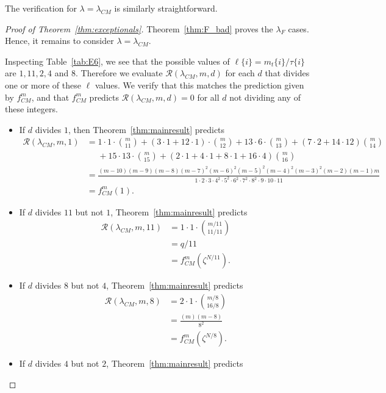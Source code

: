 \documentclass[12pt]{amsart}
\theoremstyle{definition}
\theoremstyle{remark}
\numberwithin{equation}{section}
\begin{document}
The verification for $\lambda = \lambda_{CM}$ is similarly straightforward. 

\begin{proof}[Proof of Theorem~\ref{thm:exceptionals}]
Theorem~\ref{thm:F_bad} proves the $\lambda_F$ cases. Hence, it remains to consider $\lambda = \lambda_{CM}$.

Inspecting Table~\ref{tab:E6}, we see that the possible values of $\ell\{i\} = m_t\{i\}/\tau\{i\}$ are $1,11,2,4$ and $8$. Therefore we evaluate $\mathcal{R}(\lambda_{CM},m,d)$ for each $d$ that divides one or more of these $\ell$ values. We verify that this matches the prediction given by $f^m_{CM}$, and that $f^m_{CM}$ predicts $\mathcal{R}(\lambda_{CM},m,d) = 0$ for all $d$ not dividing any of these integers.
\begin{itemize}
\item If $d$ divides $1$, then Theorem~\ref{thm:mainresult} predicts 
\begin{align*}
\mathcal{R}(\lambda_{CM},m,1) &= 1 \cdot 1 \cdot \binom{m}{11} + (3 \cdot 1  + 12 \cdot 1)  \cdot \binom{m}{12} + 13 \cdot 6 \cdot \binom{m}{13} + (7\cdot 2 + 14 \cdot 12) \binom{m}{14}  \\ &\ \ \ \ \ \ + 15 \cdot 13 \cdot \binom{m}{15} + (2 \cdot 1 + 4 \cdot 1 + 8 \cdot 1 + 16 \cdot 4) \binom{m}{16} \\
&= \frac{(m-10)(m-9)(m-8)(m-7)^2(m-6)^2(m-5)^2(m-4)^2(m-3)^2(m-2)(m-1)m}{1\cdot 2\cdot 3\cdot 4^2 \cdot 5^2 \cdot 6^2 \cdot 7^2 \cdot 8^2 \cdot 9 \cdot 10 \cdot 11} \\
&= f_{CM}^m(1).
\end{align*}
\item If $d$ divides $11$ but not $1$, Theorem~\ref{thm:mainresult} predicts
\begin{align*}
\mathcal{R}(\lambda_{CM},m,11) &= 1 \cdot 1 \cdot \binom{m/11}{11/11} \\
&= q/11 \\ 
&= f_{CM}^m(\zeta^{N/11}).
\end{align*}
\item If $d$ divides $8$ but not $4$, Theorem~\ref{thm:mainresult} predicts
\begin{align*}
\mathcal{R}(\lambda_{CM},m,8) &= 2 \cdot 1 \cdot \binom{m/8}{16/8} \\
&= \frac{(m)(m-8)}{8^2} \\
&= f_{CM}^m(\zeta^{N/8}).
\end{align*}
\item If $d$ divides $4$ but not $2$, Theorem~\ref{thm:mainresult} predicts

\end{itemize}
\end{proof}
\end{document}
